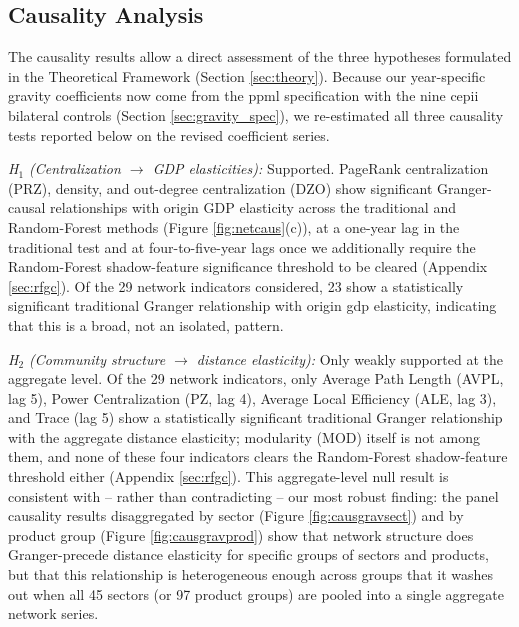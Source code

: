 \documentclass[preprint, 3p,
authoryear]{elsarticle} %
\begin{document}
\subsection{Causality Analysis}\label{causality-analysis}

The causality results allow a direct assessment of the three hypotheses
formulated in the Theoretical Framework (Section \ref{sec:theory}).
Because our year-specific gravity coefficients now come from the
\gls{ppml} specification with the nine \gls{cepii} bilateral controls
(Section \ref{sec:gravity_spec}), we re-estimated all three causality
tests reported below on the revised coefficient series.

\textit{H$_1$ (Centralization $\rightarrow$ GDP elasticities):}
Supported. PageRank centralization (PRZ), density, and out-degree
centralization (DZO) show significant Granger-causal relationships with
origin GDP elasticity across the traditional and Random-Forest methods
(Figure \ref{fig:netcaus}(c)), at a one-year lag in the traditional test
and at four-to-five-year lags once we additionally require the
Random-Forest shadow-feature significance threshold to be cleared
(Appendix \ref{sec:rfgc}). Of the 29 network indicators considered, 23
show a statistically significant traditional Granger relationship with
origin \gls{gdp} elasticity, indicating that this is a broad, not an
isolated, pattern.

\textit{H$_2$ (Community structure $\rightarrow$ distance elasticity):}
Only weakly supported at the aggregate level. Of the 29 network
indicators, only Average Path Length (AVPL, lag 5), Power Centralization
(PZ, lag 4), Average Local Efficiency (ALE, lag 3), and Trace (lag 5)
show a statistically significant traditional Granger relationship with
the aggregate distance elasticity; modularity (MOD) itself is not among
them, and none of these four indicators clears the Random-Forest
shadow-feature threshold either (Appendix \ref{sec:rfgc}). This
aggregate-level null result is consistent with -- rather than
contradicting -- our most robust finding: the panel causality results
disaggregated by sector (Figure \ref{fig:causgravsect}) and by product
group (Figure \ref{fig:causgravprod}) show that network structure does
Granger-precede distance elasticity for specific groups of sectors and
products, but that this relationship is heterogeneous enough across
groups that it washes out when all 45 sectors (or 97 product groups) are
pooled into a single aggregate network series.
\end{document}
